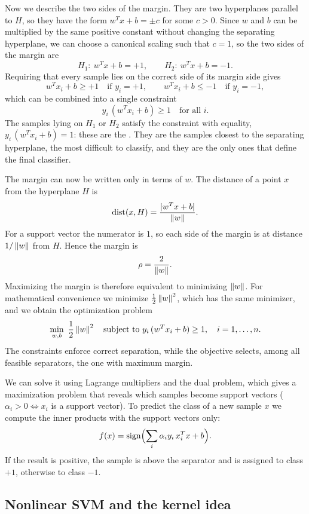Now we describe the two sides of the margin. They are two hyperplanes parallel to $H$, so they have the form $w^T x + b = \pm c$ for some $c > 0$. Since $w$ and $b$ can be multiplied by the same positive constant without changing the separating hyperplane, we can choose a canonical scaling such that $c = 1$, so the two sides of the margin are
\[
  H_1: \ w^T x + b = +1, \qquad H_2: \ w^T x + b = -1.
\]
Requiring that every sample lies on the correct side of its margin side gives
\[
  w^T x_i + b \ge +1 \quad \text{if } y_i = +1, \qquad
  w^T x_i + b \le -1 \quad \text{if } y_i = -1,
\]
which can be combined into a single constraint
\[
  y_i\,(w^T x_i + b) \ge 1 \quad \text{for all } i.
\]
The samples lying on $H_1$ or $H_2$ satisfy the constraint with equality, $y_i\,(w^T x_i + b) = 1$: these are the . They are the samples closest to the separating hyperplane, the most difficult to classify, and they are the only ones that define the final classifier.

The margin can now be written only in terms of $w$. The distance of a point $x$ from the hyperplane $H$ is
\[
  \operatorname{dist}(x, H) = \frac{|w^T x + b|}{\left\lVert w \right\rVert}.
\]
For a support vector the numerator is $1$, so each side of the margin is at distance $1/\left\lVert w \right\rVert$ from $H$. Hence the margin is
\[
  \rho = \frac{2}{\left\lVert w \right\rVert}.
\]
Maximizing the margin is therefore equivalent to minimizing $\left\lVert w \right\rVert$. For mathematical convenience we minimize $\frac{1}{2}\left\lVert w \right\rVert^2$, which has the same minimizer, and we obtain the optimization problem
\[
  \min_{w,b} \ \frac{1}{2}\left\lVert w \right\rVert^2 \quad \text{subject to } y_i\,(w^T x_i + b) \ge 1, \quad i = 1, \dots, n.
\]
The constraints enforce correct separation, while the objective selects, among all feasible separators, the one with maximum margin.

We can solve it using Lagrange multipliers and the dual problem, which gives a maximization problem that reveals which samples become support vectors ($\alpha_i > 0 \iff x_i$ is a support vector). To predict the class of a new sample $x$ we compute the inner products with the support vectors only:
\[
  f(x) = \operatorname{sign}\Bigl(\sum_{i} \alpha_i y_i\, x_i^T x + b\Bigr).
\]
If the result is positive, the sample is above the separator and is assigned to class $+1$, otherwise to class $-1$.

\subsection{Nonlinear SVM and the kernel idea}

